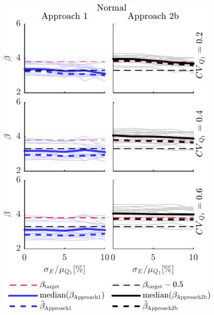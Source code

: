 \begin{figure}[htbp!] 
	\centering    
	\includegraphics[]{Normal_additive_me_beta_smallm_666_median.pdf}

\end{figure}
